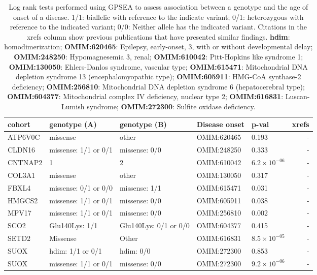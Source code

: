\begin{table}
\centering
\begin{tabular}{lp{3.5cm}p{3.5cm}>{\raggedright}p{2.5cm}lr}
\toprule
\textbf{cohort} & \textbf{genotype (A)} & \textbf{genotype (B)} & \textbf{Disease onset} & \textbf{p-val} & \textbf{xrefs}\\
\midrule
ATP6V0C & missense & other & OMIM:620465  & 0.193 & -\\
CLDN16 & missense: 1/1 or 0/1  & missense: 0/0 & OMIM:248250  & 0.333 & -\\
CNTNAP2 & 1 & 2 & OMIM:610042  & $6.2 \times 10^{-06}$ & -\\
COL3A1 & missense & other &  OMIM:130050  & 0.317 & -\\
FBXL4 &missense: 0/1 or 0/0 &missense: 1/1 & OMIM:615471  & 0.031 & -\\
HMGCS2 & missense: 1/1 or 0/1&  missense: 0/0 &  OMIM:605911  & 0.038 & -\\
MPV17 & missense: 1/1 or 0/1 &  missense: 0/0 &  OMIM:256810  & 0.002 & -\\
SCO2 & Glu140Lys: 1/1  & Glu140Lys: 0/1 or 0/0 &  OMIM:604377  & 0.415 & -\\
SETD2 & Missense & Other &  OMIM:616831  & $8.5 \times 10^{-05}$ & -\\
SUOX & hdim: 1/1 or 0/1 & hdim: 0/0&  OMIM:272300  & 0.853 & -\\
SUOX & missense: 1/1 or 0/1 &  missense: 0/0 &  OMIM:272300  & $9.2 \times 10^{-06}$ & -\\
\bottomrule
\end{tabular}
\caption{Log rank tests performed using GPSEA to assess association between a genotype and the age of
    onset of a disease. 1/1: biallelic with reference to the indicate variant; 
    0/1: heterozygous with reference to the indicated variant; 0/0: Neither allele has the indicated variant.
    Citations in the xrefs column show previous publications that have presented similar findings. \textbf{hdim}: homodimerization;
   \textbf{ OMIM:620465}: Epilepsy, early-onset, 3, with or without developmental delay; 
   \textbf{OMIM:248250}: Hypomagnesemia 3, renal;
   \textbf{OMIM:610042}: Pitt-Hopkins like syndrome 1;
   \textbf{OMIM:130050}: Ehlers-Danlos syndrome, vascular type;
   \textbf{OMIM:615471}: Mitochondrial DNA depletion syndrome 13 (encephalomyopathic type);
   \textbf{OMIM:605911}:  HMG-CoA synthase-2 deficiency;
   \textbf{OMIM:256810}: Mitochondrial DNA depletion syndrome 6 (hepatocerebral type);
   \textbf{OMIM:604377}: Mitochondrial complex IV deficiency, nuclear type 2;
   \textbf{OMIM:616831}: Luscan-Lumish syndrome;
  \textbf{OMIM:272300}: Sulfite oxidase deficiency.
   }
\label{tab:disease_onset}
\end{table}

